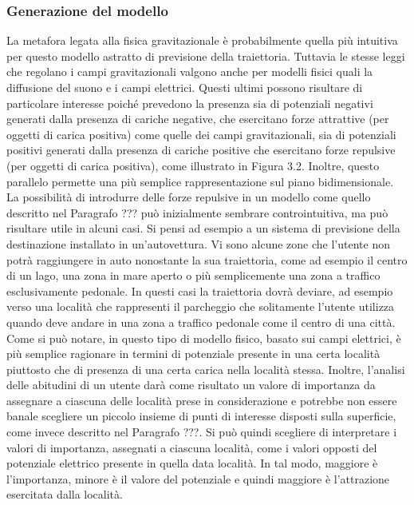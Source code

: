 \subsubsection{Generazione del modello}
La metafora legata alla fisica gravitazionale \`e probabilmente quella pi\`u intuitiva
per questo modello astratto di previsione della traiettoria. Tuttavia le
stesse leggi che regolano i campi gravitazionali valgono anche per modelli fisici
quali la diffusione del suono e i campi elettrici. Questi ultimi possono risultare
di particolare interesse poich\'e prevedono la presenza sia di potenziali negativi
generati dalla presenza di cariche negative, che esercitano forze attrattive (per
oggetti di carica positiva) come quelle dei campi gravitazionali, sia di potenziali
positivi generati dalla presenza di cariche positive che esercitano forze
repulsive (per oggetti di carica positiva), come illustrato in Figura 3.2. Inoltre,
questo parallelo permette una pi\`u semplice rappresentazione sul piano
bidimensionale.\\
La possibilit\`a di introdurre delle forze repulsive in un modello come quello
descritto nel Paragrafo ??? pu\`o inizialmente sembrare controintuitiva, ma
pu\`o risultare utile in alcuni casi. Si pensi ad esempio a un sistema di previsione
della destinazione installato in un'autovettura. Vi sono alcune zone che l'utente
non potr\`a raggiungere in auto nonostante la sua traiettoria, come ad esempio
il centro di un lago, una zona in mare aperto o pi\`u semplicemente una zona
a traffico esclusivamente pedonale. In questi casi la traiettoria dovr\`a deviare,
ad esempio verso una localit\`a che rappresenti il parcheggio che solitamente
l'utente utilizza quando deve andare in una zona a traffico pedonale come il
centro di una citt\`a.\\
Come si pu\`o notare, in questo tipo di modello fisico, basato sui campi
elettrici, \`e pi\`u semplice ragionare in termini di potenziale presente in una
certa localit\`a piuttosto che di presenza di una certa carica nella localit\`a stessa.
Inoltre, l'analisi delle abitudini di un utente dar\`a come risultato un valore di
importanza da assegnare a ciascuna delle localit\`a prese in considerazione e
potrebbe non essere banale scegliere un piccolo insieme di punti di interesse
disposti sulla superficie, come invece descritto nel Paragrafo ???. Si pu\`o
quindi scegliere di interpretare i valori di importanza, assegnati a ciascuna
localit\`a, come i valori opposti del potenziale elettrico presente in quella data
localit\`a. In tal modo, maggiore \`e l'importanza, minore \`e il valore del potenziale
e quindi maggiore \`e l'attrazione esercitata dalla localit\`a.

